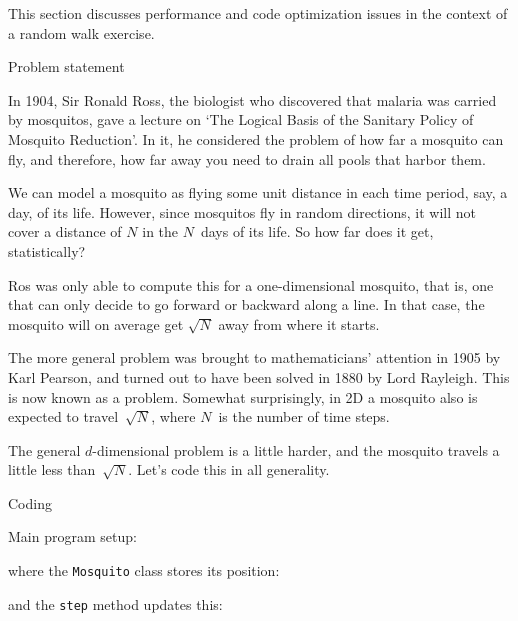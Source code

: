 
This section discusses performance and code optimization issues
in the context of a random walk exercise.

 {Problem statement}

In 1904, Sir Ronald Ross, the biologist who discovered that malaria was carried
by mosquitos, gave a lecture on
`The Logical Basis of the Sanitary Policy of Mosquito Reduction'.
In it, he considered the problem of how far a mosquito can fly,
and therefore, how far away you need to drain all pools that harbor them.

We can model a mosquito as flying some unit distance in each time period,
say, a day, of its life.
However, since mosquitos fly in random directions, it will
not cover a distance of $N$ in the $N$~days of its life.
So how far does it get, statistically?

Ros was only able to compute this for a one-dimensional mosquito,
that is, one that can only decide to go forward or backward along a line.
In that case, the mosquito will on average get $\sqrt N$ away from where it starts.

The more general problem was brought to mathematicians' attention in 1905
by Karl Pearson, and turned out to have been solved in 1880 by Lord Rayleigh.
This is now known as a  problem.
Somewhat surprisingly, in 2D a mosquito also is expected to travel~$\sqrt N$,
where $N$~is the number of time steps.

The general $d$-dimensional problem is a little harder, and the mosquito
travels a little less than~$\sqrt N$.
Let's code this in all generality.

 {Coding}

Main program setup:


where the \lstinline{Mosquito} class stores its position:


and the \lstinline{step} method updates this:


